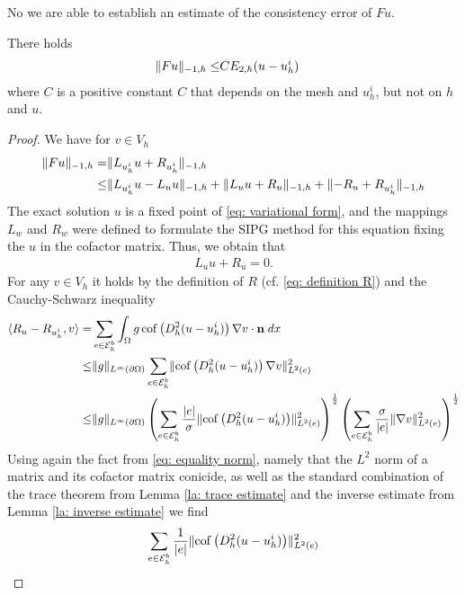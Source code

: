 No we are able to establish an estimate of the consistency error of $Fu$.
\begin{theorem} \label{la: consistency error F}
	There holds
	\begin{align*}
	\lVert Fu \rVert_{-1,h} \leq& C E_{2,h}(u-u_h^i)
	\end{align*}
	where $C$ is a positive constant $C$ that depends on the mesh and $u^i_h$, but not on $h$ and $u$. 
\end{theorem}
\begin{proof}
	We have for $v \in V_h$
	\begin{align}
	\lVert Fu \rVert_{-1,h} =& \lVert  L_{u^i_h}u + R_{u^i_h} \rVert_{-1,h} \nonumber\\
	\leq& \lVert  L_{u^i_h}u - L_u u \rVert_{-1,h} + \lVert  L_{u}u + R_u \rVert_{-1,h} + \lVert  -R_u + R_{u^i_h} \rVert_{-1,h} \label{eq: Fu first estimate}
	\end{align}	
	The exact solution $u$ is a fixed point of \eqref{eq: variational form}, and the mappings $L_w$ and $R_w$ were defined to formulate the SIPG method for this equation fixing the $u$ in the cofactor matrix. Thus, we obtain that 
	\begin{align}
	L_{u} u + R_u = 0. \label{eq: right solution L+U}
	\end{align}
	For any $v \in V_h$ it holds by the definition of $R$ (cf. \eqref{eq: definition R}) and the Cauchy-Schwarz inequality
	\begin{align}
	 \langle R_u - R_{u^i_h}, v \rangle 
	=& \sum_{e \in \mathcal{E}_h^b} \int_{\Omega} {{g \operatorname{cof} \left( D_h^2 (u-u_h^i) \right) \nabla v \cdot \mathbf n }\;dx}\nonumber \\
	\leq& \lVert g \rVert_{L^\infty(\partial \Omega)}
		\sum_{e \in \mathcal{E}_h^b} \lVert  \operatorname{cof} \left( D_h^2 (u-u_h^i) \right) \nabla v  \rVert_{L^2(e)}^2 \nonumber \\
	\leq& \lVert g \rVert_{L^\infty(\partial \Omega)}
		\left( \sum_{e \in \mathcal{E}_h^b} \frac {|e|} \sigma \lVert  \operatorname{cof} \left( D_h^2 (u-u_h^i) \right) \rVert_{L^2(e)}^2  \right)^{\frac 1 2}
		\left( \sum_{e \in \mathcal{E}_h^b} \frac \sigma {|e|} \lVert \nabla v  \rVert_{L^2(e)}^2  \right)^{\frac 1 2}	 \label{eq: R first estimate}
	\end{align}
	Using again the fact from \eqref{eq: equality norm}, namely that the $L^2$ norm of a matrix and its cofactor matrix conicide, as well as the standard combination of the trace theorem from Lemma \ref{la: trace estimate} and the inverse estimate from Lemma \ref{la: inverse estimate} we find
	\begin{align}
	\sum_{e \in \edgesb} \frac 1 {|e|} \LTwonormE{ \cofHessH{(u-u_h^i)}}^2 

\end{align}
\end{proof}
